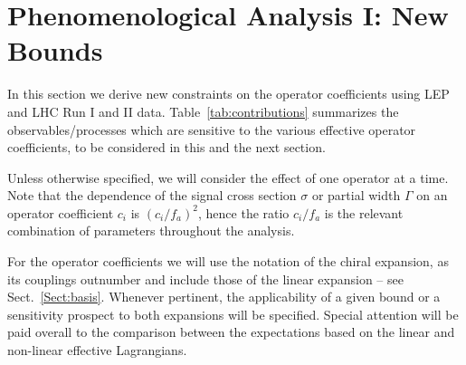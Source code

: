 \documentclass[11pt]{article}
\renewcommand{\[}{\begin{equation}}
\renewcommand{\]}{\end{equation}}
\begin{document}
\section{Phenomenological Analysis I: New Bounds}
\label{Sect:PhenoAnalysisPresent}

In this section we derive new constraints on the operator coefficients using LEP and  LHC Run I and II  data. Table~\ref{tab:contributions} summarizes the 
observables/processes which are sensitive to the various effective operator coefficients, to be considered in this and the next section. 


Unless otherwise specified,  we will consider the effect of one operator  at a time. Note that the   dependence of the signal cross section $\sigma$ or partial 
width $\Gamma$ on an  operator coefficient $c_i$ is $(c_i/f_a)^2$, hence the ratio $c_i/f_a$ is the relevant combination of parameters throughout the analysis.

For the operator coefficients we will use the notation of the chiral expansion,  as its couplings outnumber and include those of the 
linear expansion -- see Sect.~\ref{Sect:basis}.  Whenever pertinent, the applicability of a given bound or a sensitivity prospect to both expansions will be specified.
   Special attention will be paid overall to the comparison between the expectations based on the linear and non-linear effective Lagrangians. 
 
\end{document}
